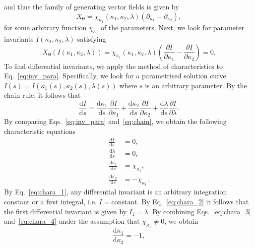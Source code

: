 \documentclass[12pt]{article}
\begin{document}
and thus the family of generating vector fields is given by
\begin{equation}
    X_{\boldsymbol{\theta}}=\chi_{\kappa_{1}}(\kappa_{1},\kappa_{2},\lambda)(\partial_{\kappa_{1}}-\partial_{\kappa_{2}}),
    \label{eq:X_theta_2}
\end{equation}
for some arbitrary function $\chi_{\kappa_{1}}$ of the parameters. Next, we look for parameter invariants $I(\kappa_{1},\kappa_{2},\lambda)$ satisfying 
\begin{equation}
    X_{\boldsymbol{\theta}}(I(\kappa_{1},\kappa_{2},\lambda))=\chi_{\kappa_{1}}(\kappa_{1},\kappa_{2},\lambda)\left(\frac{\partial I}{\partial\kappa_{1}}-\frac{\partial I}{\partial\kappa_{2}}\right)=0.
    \label{eq:inv_para}
\end{equation}
To find differential invariants, we apply the method of characteristics to Eq.~\eqref{eq:inv_para}. Specifically, we look for a parametrised solution curve $I(s)=I(\kappa_{1}(s),\kappa_{2}(s),\lambda(s))$ where $s$ is an arbitrary parameter. By the chain rule, it follows that
\begin{equation}
    \frac{\mathrm{d}I}{\mathrm{d}s}=\frac{\mathrm{d}\kappa_{1}}{\mathrm{d}s}\frac{\partial I}{\partial\kappa_{1}}+\frac{\mathrm{d}\kappa_{2}}{\mathrm{d}s}\frac{\partial I}{\partial\kappa_{2}}+\frac{\mathrm{d}\lambda}{\mathrm{d}s}\frac{\partial I}{\partial \lambda}.
    \label{eq:chain}    
\end{equation}
By comparing Eqs.~\eqref{eq:inv_para} and~\eqref{eq:chain}, we obtain the following characteristic equations
\begin{align}
    \frac{\mathrm{d}I}{\mathrm{d}s}&=0,\label{eq:chara_1}\\
    \frac{\mathrm{d}\lambda}{\mathrm{d}s}&=0,\label{eq:chara_2}\\
    \frac{\mathrm{d}\kappa_{1}}{\mathrm{d}s}&=\chi_{\kappa_{1}},\label{eq:chara_3}\\
    \frac{\mathrm{d}\kappa_{2}}{\mathrm{d}s}&=-\chi_{\kappa_{1}}.\label{eq:chara_4}
\end{align}
By Eq.~\eqref{eq:chara_1}, any differential invariant is an arbitrary integration constant or a first integral, i.e. $I=\mathrm{constant}$. By Eq.~\eqref{eq:chara_2} it follows that the first differential invariant is given by $I_{1}=\lambda$. By combining Eqs.~\eqref{eq:chara_3} and~\eqref{eq:chara_4} under the assumption that $\chi_{\kappa_{1}}\neq 0$, we obtain 
\begin{equation}
    \frac{\mathrm{d}\kappa_{1}}{\mathrm{d}\kappa_{2}}=-1,
    \label{eq:temp_ODE}
\end{equation}
\end{document}
